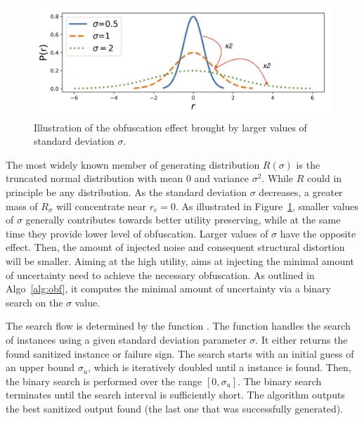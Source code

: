 \begin{figure}[htb]
  \centering
        \includegraphics[width=0.8\linewidth]{ill/std_2.jpg}
  \vspace{-5pt}
  \caption{Illustration of the obfuscation effect brought by larger values of standard deviation $\sigma$.}
  \vspace{-5pt}
  \label{fig:std}
\end{figure} 
The most widely known member of generating distribution $R({\sigma})$ is the truncated normal distribution with mean 0 and variance $\sigma^2$. 
While $R$ could in principle be any distribution.
As the standard deviation $\sigma$ decreases, a greater mass of $R_{\sigma}$ will concentrate near $r_{e}=0$.  
As illustrated in Figure~\ref{fig:std}, smaller values of $\sigma$ generally contributes towards better utility preserving, while at the same time they provide lower level of obfuscation. 
Larger values of $\sigma$ have the opposite effect.
Then, the amount of injected noise and consequent structural distortion will be smaller. 
Aiming at the high utility, {\soaName} aims at injecting the minimal amount of uncertainty need to achieve the necessary obfuscation. 
As outlined in Algo~\ref{alg:obf}, it computes the minimal amount of uncertainty via a binary search on the $\sigma$ value. 


The search flow is determined by the function {\genobf}. The function {\genobf} handles the search of {\keobf} instances using a given standard deviation parameter $\sigma$. It either returns the found sanitized instance or failure sign.
The search starts with an initial guess of an upper bound $\sigma_{u}$, which is iteratively doubled until a {\keobf} instance is found. Then, the binary search is performed over the range $[0,\sigma_{u}]$. The binary search terminates until the search interval is sufficiently short. The algorithm outputs the best sanitized output found (the last one that was successfully generated).

